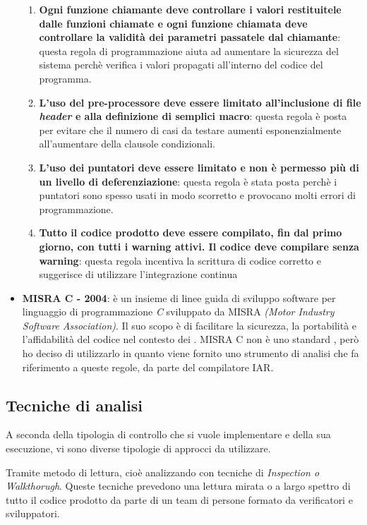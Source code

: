 \begin{itemize}
\begin{enumerate}
\item \textbf{Ogni funzione chiamante deve controllare i valori restituitele dalle funzioni chiamate e ogni funzione chiamata deve controllare la validità dei parametri passatele dal chiamante}: questa regola di programmazione aiuta ad aumentare la sicurezza del sistema perchè verifica i valori propagati all'interno del codice del programma.

\item \textbf{L'uso del pre-processore deve essere limitato all'inclusione di file \textit{header} e alla definizione di semplici macro}: questa regola è posta per evitare che il numero di casi da testare aumenti esponenzialmente all'aumentare della clausole condizionali.

\item \textbf{L'uso dei puntatori deve essere limitato e non è permesso più di un livello di deferenziazione}: questa regola è stata posta perchè i puntatori sono spesso usati in modo scorretto e provocano molti errori di programmazione.

\item \textbf{Tutto il codice prodotto deve essere compilato, fin dal primo giorno, con tutti i warning attivi. Il codice deve compilare senza warning}: questa regola incentiva la scrittura di codice corretto e suggerisce di utilizzare l'integrazione continua
\end{enumerate} 

\item[] \textbf{MISRA C - 2004}: è un insieme di linee guida di sviluppo software per linguaggio di programmazione \textit{C} sviluppato da MISRA \textit{(Motor Industry Software Association)}. Il suo scopo è di facilitare la sicurezza, la portabilità e l'affidabilità del codice nel contesto dei .
MISRA C non è uno standard , però ho deciso di utilizzarlo in quanto viene fornito uno strumento di analisi che fa riferimento a queste regole, da parte del compilatore IAR.
\end{itemize}

\subsection{Tecniche di analisi}
A seconda della tipologia di controllo che si vuole implementare e della sua esecuzione, vi sono diverse tipologie di approcci da utilizzare.

Tramite metodo di lettura, cioè analizzando con tecniche di \textit{Inspection o Walkthorugh}. Queste tecniche prevedono una lettura mirata o a largo spettro di tutto il codice prodotto da parte di un team di persone formato da verificatori e sviluppatori. 


